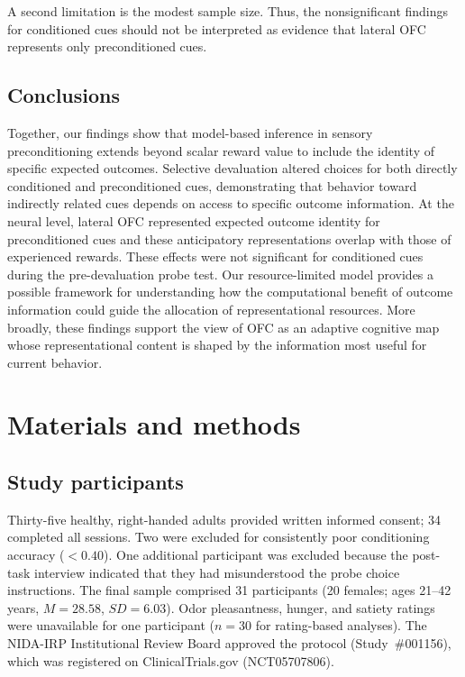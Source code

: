 \documentclass[12pt,letterpaper]{article}
\DeclareRobustCommand{\hl}{\textcolor{reviewtext}}
\begin{document}
A second limitation is the modest sample size. Thus, the nonsignificant findings for conditioned cues should not be interpreted as evidence that lateral OFC represents only preconditioned cues.


\subsection*{Conclusions}

Together, our findings show that model-based inference in sensory preconditioning extends beyond scalar reward value to include the identity of specific expected outcomes. Selective devaluation altered choices for both directly conditioned and preconditioned cues, demonstrating that behavior toward indirectly related cues depends on access to specific outcome information. At the neural level, lateral OFC represented expected outcome identity for preconditioned cues and these anticipatory representations overlap with those of experienced rewards. These effects were not significant for conditioned cues \hl{during the pre-devaluation probe test}. Our resource-limited model provides a possible framework for understanding how the computational benefit of outcome information could guide the allocation of representational resources. More broadly, these findings support the view of OFC as an adaptive cognitive map whose representational content is shaped by the information most useful for current behavior.





\section*{Materials and methods}


\subsection*{Study participants}

Thirty-five healthy, right-handed adults provided written informed consent; 34 completed all sessions. Two were excluded for consistently poor conditioning accuracy ($<0.40$). One additional participant was excluded because the post-task interview indicated that they had misunderstood the probe choice instructions. The final sample comprised 31 participants (20 females; ages 21--42 years, $M = 28.58$, $SD = 6.03$). Odor pleasantness, hunger, and satiety ratings were unavailable for one participant ($n = 30$ for rating-based analyses). The NIDA-IRP Institutional Review Board approved the protocol (Study~\#001156), which was registered on ClinicalTrials.gov (NCT05707806).
\end{document}
